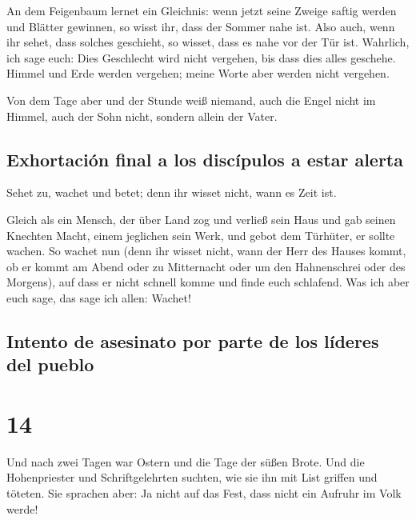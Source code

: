  An dem Feigenbaum lernet ein Gleichnis: wenn jetzt seine
Zweige saftig werden und Blätter gewinnen, so wisst ihr, dass der Sommer
nahe ist.  Also auch, wenn ihr sehet, dass solches
geschieht, so wisset, dass es nahe vor der Tür ist. 
Wahrlich, ich sage euch: Dies Geschlecht wird nicht vergehen, bis dass
dies alles geschehe.  Himmel und Erde werden vergehen;
meine Worte aber werden nicht vergehen.

 Von dem Tage aber und der Stunde weiß niemand, auch die
Engel nicht im Himmel, auch der Sohn nicht, sondern allein der Vater.

\hypertarget{exhortaciuxf3n-final-a-los-discuxedpulos-a-estar-alerta}{%
\subsection{Exhortación final a los discípulos a estar
alerta}\label{exhortaciuxf3n-final-a-los-discuxedpulos-a-estar-alerta}}

 Sehet zu, wachet und betet; denn ihr wisset nicht, wann
es Zeit ist.

 Gleich als ein Mensch, der über Land zog und verließ
sein Haus und gab seinen Knechten Macht, einem jeglichen sein Werk, und
gebot dem Türhüter, er sollte wachen.  So wachet nun
(denn ihr wisset nicht, wann der Herr des Hauses kommt, ob er kommt am
Abend oder zu Mitternacht oder um den Hahnenschrei oder des Morgens),
 auf dass er nicht schnell komme und finde euch
schlafend.  Was ich aber euch sage, das sage ich allen:
Wachet!

\hypertarget{intento-de-asesinato-por-parte-de-los-luxedderes-del-pueblo}{%
\subsection{Intento de asesinato por parte de los líderes del
pueblo}\label{intento-de-asesinato-por-parte-de-los-luxedderes-del-pueblo}}

\hypertarget{section-13}{%
\section{14}\label{section-13}}

 Und nach zwei Tagen war Ostern und die Tage der süßen
Brote. Und die Hohenpriester und Schriftgelehrten suchten, wie sie ihn
mit List griffen und töteten.  Sie sprachen aber: Ja nicht
auf das Fest, dass nicht ein Aufruhr im Volk werde!

